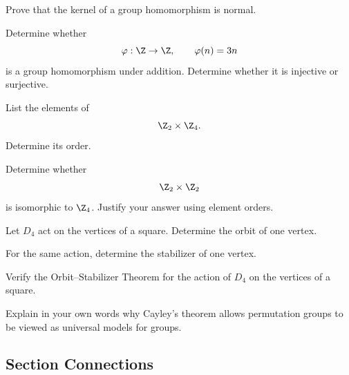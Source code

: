 \begin{exercise}[3]
Prove that the kernel of a group homomorphism is normal.
\end{exercise}

\begin{exercise}[2]
Determine whether
\[ \varphi:\Z\to\Z,\qquad\varphi(n)=3n \]
is a group homomorphism under addition. Determine whether it is injective or
surjective.
\end{exercise}

\begin{exercise}[2]
List the elements of
\[ \Z_2\times\Z_4. \]
Determine its order.
\end{exercise}

\begin{exercise}[3]
Determine whether
\[ \Z_2\times\Z_2 \]
is isomorphic to \(\Z_4\). Justify your answer using element orders.
\end{exercise}

\begin{exercise}[2]
Let \(D_4\) act on the vertices of a square. Determine the orbit of one vertex.
\end{exercise}

\begin{exercise}[2]
For the same action, determine the stabilizer of one vertex.
\end{exercise}

\begin{exercise}[3]
Verify the Orbit--Stabilizer Theorem for the action of \(D_4\) on the vertices
of a square.
\end{exercise}

\begin{exercise}[3]
Explain in your own words why Cayley's theorem allows permutation groups to be
viewed as universal models for groups.
\end{exercise}

\subsection{Section Connections}
\label{subsec:group-theory-connections}


